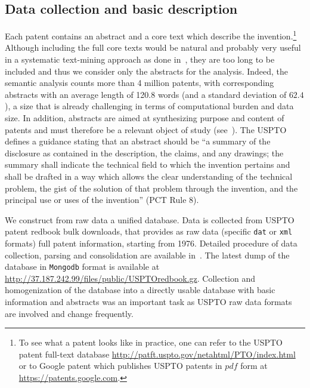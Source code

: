 \documentclass[10pt,A4,draft]{article}
\begin{document}
\subsection{Data collection and basic description}
Each patent contains an abstract and a core text which describe the invention.\footnote{To see what a patent looks like in practice, one can refer to the USPTO patent full-text database \url{http://patft.uspto.gov/netahtml/PTO/index.html} or to Google patent which publishes USPTO patents in $pdf$ form at \url{https://patents.google.com}.} Although including the full core texts would be natural and probably very useful in a systematic text-mining approach as done in~\cite{tseng2007text}, they are too long to be included and thus we consider only the abstracts for the analysis. Indeed, the semantic analysis counts more than 4 million patents, with corresponding abstracts with an average length of 120.8 words (and a standard deviation of $62.4$), a size that is already challenging in terms of computational burden and data size. In addition, abstracts are aimed at synthesizing purpose and content of patents and must therefore be a relevant object of study (see~\cite{Adams2010text}). The USPTO defines a guidance stating that an abstract should be ``a summary of the disclosure as contained in the description, the claims, and any drawings; the summary shall indicate the technical field to which the invention pertains and shall be drafted in a way which allows the clear understanding of the technical problem, the gist of the solution of that problem through the invention, and the principal use or uses of the invention'' (PCT Rule 8). 

We construct from raw data a unified database. Data is collected from USPTO patent redbook bulk downloads, that provides as raw data (specific \texttt{dat} or \texttt{xml} formats) full patent information, starting from 1976. Detailed procedure of data collection, parsing and consolidation are available in~. The latest dump of the database in \texttt{Mongodb} format is available at \url{http://37.187.242.99/files/public/USPTOredbook.gz}.
Collection and homogenization of the database into a directly usable database with basic information and abstracts was an important task as USPTO raw data formats are involved and change frequently.
\end{document}
